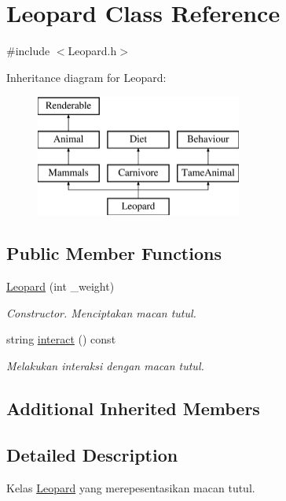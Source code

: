 \hypertarget{classLeopard}{\section{Leopard Class Reference}
\label{classLeopard}
}


{\ttfamily \#include $<$Leopard.\+h$>$}

Inheritance diagram for Leopard\+:\begin{figure}[H]
\begin{center}
\leavevmode
\includegraphics[height=4.000000cm]{classLeopard}
\end{center}
\end{figure}
\subsection*{Public Member Functions}
\begin{DoxyCompactItemize}
\item 
\hypertarget{classLeopard_a61dec30839864695de1c7a865fee2c0b}{\hyperlink{classLeopard_a61dec30839864695de1c7a865fee2c0b}{Leopard} (int \+\_\+weight)}\label{classLeopard_a61dec30839864695de1c7a865fee2c0b}

\begin{DoxyCompactList}\small\item\em Constructor. Menciptakan macan tutul. \end{DoxyCompactList}\item 
string \hyperlink{classLeopard_a8f74bdd86e8df25bbab7d1136944e7d9}{interact} () const 
\begin{DoxyCompactList}\small\item\em Melakukan interaksi dengan macan tutul. \end{DoxyCompactList}\end{DoxyCompactItemize}
\subsection*{Additional Inherited Members}


\subsection{Detailed Description}
Kelas \hyperlink{classLeopard}{Leopard} yang merepesentasikan macan tutul. 


